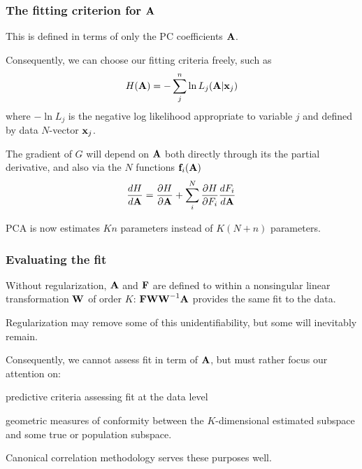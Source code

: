 \documentclass[11pt]{beamer}
\begin{document}

\begin{frame}

\frametitle{The fitting criterion for $\mbox{\bf A}$}

\bi
  \item This is defined in terms of only the PC coefficients $\mbox{\bf A}$.
  \item Consequently, we can choose our fitting criteria freely, such as
    \[
      H(\mbox{\bf A}) = -\sum_j^n \ln L_j(\mbox{\bf A}|\mbox{\bf x}_j)
    \]
  where $-\ln L_j$ is the negative log likelihood appropriate to variable $j$ and defined by data $N$-vector $\mbox{\bf x}_j$.
  \item The gradient of $G$ will depend on $\mbox{\bf A}$ both directly through its the partial derivative, and also via the $N$ functions $\mbox{\bf f}_i(\mbox{\bf A})$
    \[
        \frac{dH}{d \mbox{\bf A}} = \frac{\partial H}{\partial \mbox{\bf A}} +
        \sum_i^N \frac{\partial H}{\partial F_i} \frac{dF_i}{d \mbox{\bf A}}
    \]
  \item PCA is now estimates $Kn$ parameters instead of $K(N+n)$ parameters.
\ei

\end{frame}


\begin{frame}

\frametitle{Evaluating the fit}

\bi
  \item Without regularization, $\mbox{\bf A}$ and $\mbox{\bf F}$ are defined to within a nonsingular linear transformation $\mbox{\bf W}$ of order $K$: $\mbox{\bf F} \mbox{\bf W} \mbox{\bf W}^{-1} \mbox{\bf A}$ provides the same fit to the data.
  \item Regularization may remove some of this unidentifiability, but some will inevitably remain.
  \item Consequently, we cannot assess fit in term of $\mbox{\bf A}$, but must rather focus our attention on:
  \bi
    \item predictive criteria assessing fit at the data level
    \item geometric measures of conformity between the $K$-dimensional estimated subspace and some true or population subspace.
  \ei
  \item Canonical correlation methodology serves these purposes well.
\ei

\end{frame}
\end{document}
